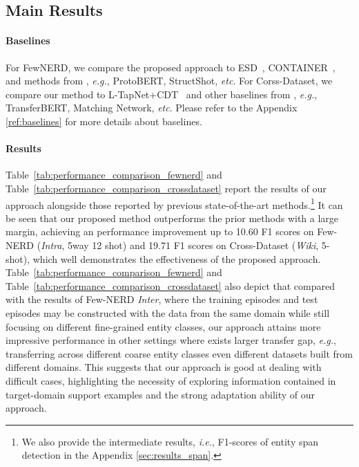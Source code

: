 \documentclass[11pt]{article}
\newcommand\ie{\textit{i.e.}}
\newcommand\eg{\textit{e.g.}}
\newcommand\etc{\textit{etc}}
\begin{document}
\subsection{Main Results}
\paragraph{Baselines} For FewNERD, we compare the proposed approach to ESD~\citep{wang2021enhanced}, CONTAINER~\citep{das2021container}, and methods from \citet{ding2021nerd}, \eg, ProtoBERT, StructShot, \etc. For Corss-Dataset, we compare our method to L-TapNet+CDT~\citep{hou2020few} and other baselines from \citet{hou2020few}, \eg, TransferBERT, Matching Network, \etc.
Please refer to the Appendix \ref{ref:baselines} for more details about baselines.

\paragraph{Results}
Table~\ref{tab:performance_comparison_fewnerd} and Table~\ref{tab:performance_comparison_crossdataset} report the results of our approach alongside those reported by previous state-of-the-art methods.\footnote{We also provide the intermediate results, \ie, F1-scores of entity span detection in the Appendix \ref{sec:results_span}.}
It can be seen that our proposed method outperforms the prior methods with a large margin, achieving an performance improvement up to 10.60 F1 scores on Few-NERD (\textit{Intra}, 5way 12 shot) and 19.71 F1 scores on Cross-Dataset (\textit{Wiki}, 5-shot), which well demonstrates the effectiveness of the proposed approach.
Table~\ref{tab:performance_comparison_fewnerd} and Table~\ref{tab:performance_comparison_crossdataset} also depict that compared with the results of Few-NERD \textit{Inter}, where the training episodes and test episodes may be constructed with the data from the same domain while still focusing on different fine-grained entity classes, our approach attains more impressive performance in other settings where exists larger transfer gap, \eg, transferring across different coarse entity classes even different datasets built from different domains.
This suggests that our approach is good at dealing with difficult cases, highlighting the necessity of exploring information contained in target-domain support examples and the strong adaptation ability of our approach.
\end{document}
